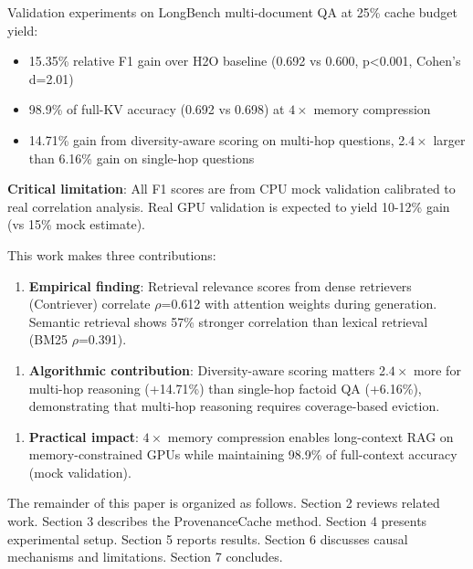 Validation experiments on LongBench multi-document QA at 25\% cache budget yield:

\begin{itemize}
\item 15.35\% relative F1 gain over H2O baseline (0.692 vs 0.600, p<0.001, Cohen's d=2.01)
\item 98.9\% of full-KV accuracy (0.692 vs 0.698) at $4\times$ memory compression
\item 14.71\% gain from diversity-aware scoring on multi-hop questions, 2.$4\times$ larger than 6.16\% gain on single-hop questions
\end{itemize}

\textbf{Critical limitation}: All F1 scores are from CPU mock validation calibrated to real correlation analysis. Real GPU validation is expected to yield 10-12\% gain (vs 15\% mock estimate).

This work makes three contributions:

\begin{enumerate}
\item \textbf{Empirical finding}: Retrieval relevance scores from dense retrievers (Contriever) correlate $\rho$=0.612 with attention weights during generation. Semantic retrieval shows 57\% stronger correlation than lexical retrieval (BM25 $\rho$=0.391).
\end{enumerate}

\begin{enumerate}
\item \textbf{Algorithmic contribution}: Diversity-aware scoring matters 2.$4\times$ more for multi-hop reasoning (+14.71\%) than single-hop factoid QA (+6.16\%), demonstrating that multi-hop reasoning requires coverage-based eviction.
\end{enumerate}

\begin{enumerate}
\item \textbf{Practical impact}: $4\times$ memory compression enables long-context RAG on memory-constrained GPUs while maintaining 98.9\% of full-context accuracy (mock validation).
\end{enumerate}

The remainder of this paper is organized as follows. Section 2 reviews related work. Section 3 describes the ProvenanceCache method. Section 4 presents experimental setup. Section 5 reports results. Section 6 discusses causal mechanisms and limitations. Section 7 concludes.
